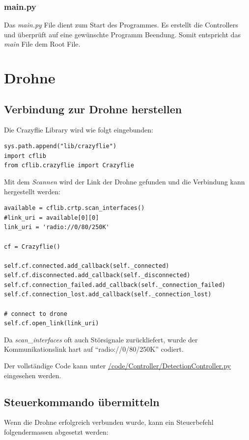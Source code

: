 \subsubsection{main.py}
Das \textit{main.py} File dient zum Start des Programmes. Es erstellt die Controllers und überprüft auf eine gewünschte Programm Beendung. Somit entspricht das \textit{main} File dem Root File.


\section{Drohne}
\subsection{Verbindung zur Drohne herstellen}
Die Crazyflie Library wird wie folgt eingebunden:
\begin{lstlisting}[style=lstStyleCpp]
sys.path.append("lib/crazyflie")
import cflib
from cflib.crazyflie import Crazyflie
\end{lstlisting}

Mit dem \textit{Scannen} wird der Link der Drohne gefunden und die Verbindung kann hergestellt werden:
\begin{lstlisting}[style=lstStyleCpp]
available = cflib.crtp.scan_interfaces()
#link_uri = available[0][0]
link_uri = 'radio://0/80/250K'

cf = Crazyflie()

self.cf.connected.add_callback(self._connected)
self.cf.disconnected.add_callback(self._disconnected)
self.cf.connection_failed.add_callback(self._connection_failed)
self.cf.connection_lost.add_callback(self._connection_lost)

# connect to drone
self.cf.open_link(link_uri)
\end{lstlisting}

Da \textit{scan\_interfaces} oft auch Störsignale zurückliefert, wurde der Kommunikationslink hart auf "`radio://0/80/250K"' codiert.

Der vollständige Code kann unter \href{https://github.com/MrJack91/droneGestures/blob/master/code/Controller/CrazyflieController.py}{/code/Controller/DetectionController.py} eingesehen werden.

\subsection{Steuerkommando übermitteln}
Wenn die Drohne erfolgreich verbunden wurde, kann ein Steuerbefehl folgendermassen abgesetzt werden:

